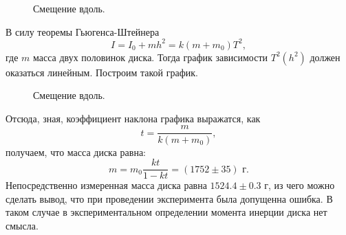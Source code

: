\documentclass[a4paper, 12pt]{article}%
\begin{document}
\begin{figure}[h!]
\caption{Смещение вдоль.}
\end{figure}

В силу теоремы Гьюгенса-Штейнера 
\[I=I_0+mh^2=k(m+m_0)T^2,\]
где $m$ масса двух половинок диска. Тогда график зависимости $T^2(h^2)$ должен оказаться линейным. Построим такой график.

\begin{figure}[h!]
\caption{Смещение вдоль.}
\end{figure}

Отсюда, зная, коэффициент наклона графика выражатся, как
\[t=\dfrac{m}{k(m+m_0)},\]
получаем, что масса диска равна:
\[m=m_0\dfrac{kt}{1-kt}=(1752\pm35)\text{ г}.\]
Непосредственно измеренная масса диска равна $1524.4\pm0.3$ г, из чего можно сделать вывод, что при проведении эксперимента была допущенна ошибка. В таком случае в экспериментальном определении момента инерции диска нет смысла.
\end{document}
